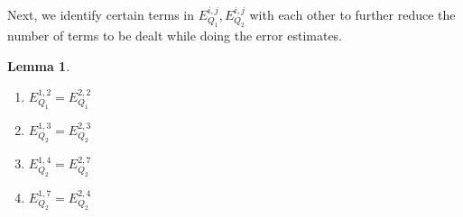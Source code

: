\documentclass[sn-mathphys, Numbered ,a4paper]{sn-jnl}%
\theoremstyle{plain}
\newtheorem{lemma}[theorem]{Lemma}
\theoremstyle{definition}
\theoremstyle{remark}
\newtheorem{remark}[theorem]{Remark}
\theoremstyle{plain}
\theoremstyle{definition}
\theoremstyle{remark}
\begin{document}
Next, we identify certain terms in $E_{Q_1}^{i,j}, E_{Q_2}^{i,j}$ with each other to further reduce the number of terms to be dealt while doing the error estimates.

\begin{lemma}
	\begin{enumerate}
		\item $E_{Q_1}^{1,2} = E_{Q_1}^{2,2}$ 
		\item $E_{Q_2}^{1,3} = E_{Q_2}^{2,3}$ 
		\item $E_{Q_2}^{1,4} = E_{Q_2}^{2,7}$
		\item $E_{Q_2}^{1,7} = E_{Q_2}^{2,4}$  
	\end{enumerate}
\end{lemma}	 
\begin{comment}

\begin{remark}
	We also have the following identification: $E_{Q_2}^{1,4} = E_{Q_2}^{2,7} = E_{Q_2}^{6,6}$,  as all three terms contain contributions from $q$ and $-q$. 
\end{remark}
\end{comment}
\end{document}
